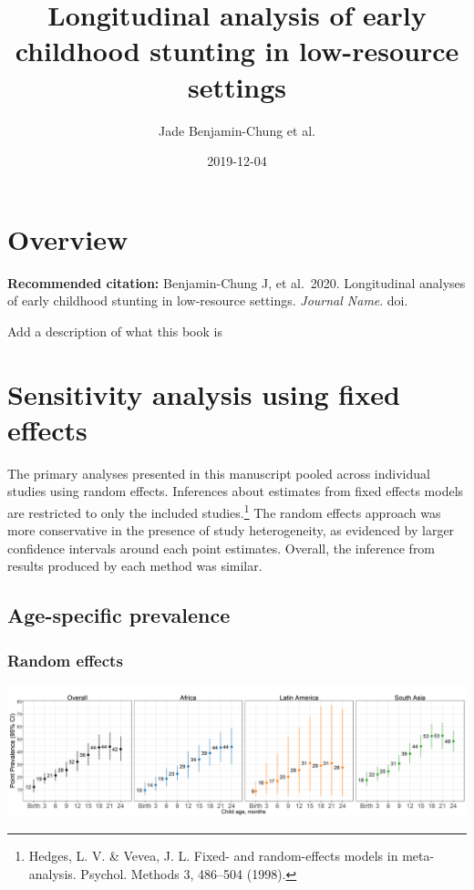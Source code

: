 \documentclass[9pt,]{book}
\title{Longitudinal analysis of early childhood stunting in low-resource settings}
\author{Jade Benjamin-Chung et al.}
\date{2019-12-04}
\let\rmarkdownfootnote\footnote%
\def\footnote{\protect\rmarkdownfootnote}
\begin{document}
\maketitle

{
\setcounter{tocdepth}{1}
\tableofcontents
}
\hypertarget{overview}{%
\chapter{Overview}\label{overview}}

\textbf{Recommended citation:} Benjamin-Chung J, et al.~2020. Longitudinal analyses of early childhood stunting in low-resource settings. \emph{Journal Name}. doi.

Add a description of what this book is

\hypertarget{fixed-effects}{%
\chapter{Sensitivity analysis using fixed effects}\label{fixed-effects}}

The primary analyses presented in this manuscript pooled across individual studies using random effects. Inferences about estimates from fixed effects models are restricted to only the included studies.\footnote{Hedges, L. V. \& Vevea, J. L. Fixed- and random-effects models in meta-analysis. Psychol. Methods 3, 486--504 (1998).} The random effects approach was more conservative in the presence of study heterogeneity, as evidenced by larger confidence intervals around each point estimates. Overall, the inference from results produced by each method was similar.

\hypertarget{age-specific-prevalence}{%
\section{Age-specific prevalence}\label{age-specific-prevalence}}

\hypertarget{random-effects}{%
\subsection{Random effects}\label{random-effects}}

\includegraphics[width=58.33in]{figure-copies/fig-stunt-2-prev-overall_region--allage-primary}
\end{document}
